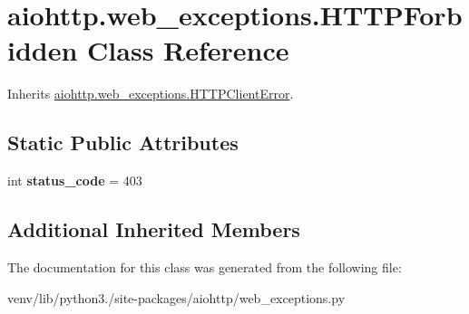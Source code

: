 \hypertarget{classaiohttp_1_1web__exceptions_1_1_h_t_t_p_forbidden}{}\section{aiohttp.\+web\+\_\+exceptions.\+H\+T\+T\+P\+Forbidden Class Reference}
\label{classaiohttp_1_1web__exceptions_1_1_h_t_t_p_forbidden}


Inherits \hyperlink{classaiohttp_1_1web__exceptions_1_1_h_t_t_p_client_error}{aiohttp.\+web\+\_\+exceptions.\+H\+T\+T\+P\+Client\+Error}.

\subsection*{Static Public Attributes}
\begin{DoxyCompactItemize}
\item 
\mbox{\label{classaiohttp_1_1web__exceptions_1_1_h_t_t_p_forbidden_a2fe519ae98827e1981f6c6646bcf0dd7}} 
int {\bfseries status\+\_\+code} = 403
\end{DoxyCompactItemize}
\subsection*{Additional Inherited Members}


The documentation for this class was generated from the following file\+:\begin{DoxyCompactItemize}
\item 
venv/lib/python3./site-\/packages/aiohttp/web\+\_\+exceptions.\+py\end{DoxyCompactItemize}
